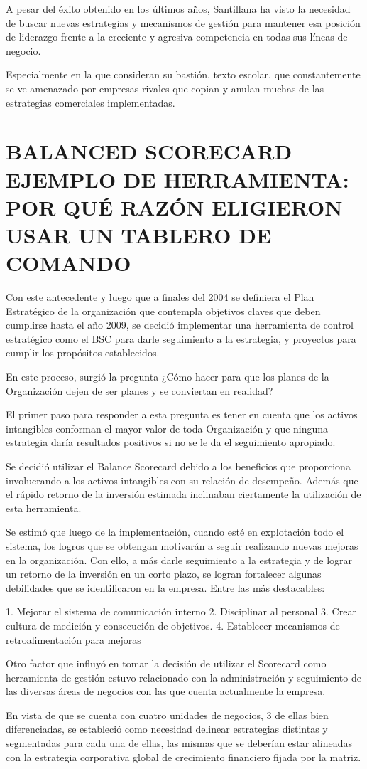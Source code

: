 \item { A pesar del éxito obtenido en los últimos años, Santillana ha visto la necesidad de buscar nuevas estrategias y mecanismos de gestión  para mantener esa posición de liderazgo frente a la creciente y agresiva competencia en todas sus líneas de negocio.

Especialmente en la que consideran su bastión, texto escolar, que constantemente se ve amenazado por empresas rivales que copian y anulan muchas de las estrategias comerciales implementadas.}

\section{BALANCED SCORECARD EJEMPLO DE HERRAMIENTA: POR QUÉ RAZÓN ELIGIERON USAR UN TABLERO DE COMANDO}
\item { Con este antecedente y luego que a finales del 2004 se definiera el Plan Estratégico de la organización que contempla objetivos claves que deben cumplirse hasta el año 2009, se decidió implementar una herramienta de control estratégico como el BSC para darle seguimiento a la estrategia, y proyectos para cumplir los propósitos establecidos.

En este proceso, surgió la pregunta ¿Cómo hacer para que los planes de la Organización dejen de ser planes y se conviertan en realidad?

El primer paso para responder a esta pregunta es tener en cuenta que los activos intangibles conforman el mayor valor de toda Organización y que ninguna estrategia daría resultados positivos si no se le da el seguimiento apropiado.

Se decidió utilizar el Balance Scorecard debido a los beneficios que proporciona involucrando a los activos intangibles con su relación de desempeño. Además que el rápido retorno de la inversión estimada inclinaban ciertamente la utilización de esta herramienta.

Se estimó que luego de la implementación, cuando esté en explotación todo el sistema, los logros que se obtengan motivarán a seguir realizando nuevas mejoras en la organización. Con ello, a más darle seguimiento a la estrategia y de lograr un retorno de la inversión en un corto plazo, se logran fortalecer algunas debilidades que se identificaron en la empresa. Entre las más destacables:

1. Mejorar el sistema de comunicación interno
2. Disciplinar al personal
3. Crear cultura de medición y consecución de objetivos.
4. Establecer mecanismos de retroalimentación para mejoras

Otro factor que influyó en tomar la decisión de utilizar el Scorecard como herramienta de gestión estuvo relacionado con la administración y seguimiento de las diversas áreas de negocios con las que cuenta actualmente la empresa.

En vista de que se cuenta con cuatro unidades de negocios, 3 de ellas bien diferenciadas, se estableció como necesidad delinear estrategias distintas y segmentadas para cada una de ellas, las mismas que se deberían estar alineadas con la estrategia corporativa global de crecimiento financiero fijada por la matriz.}

